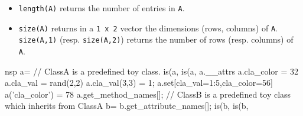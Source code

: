 \begin{itemize}
\item \verb+length(A)+ returns the number of entries in \verb+A+.
\item \verb+size(A)+ returns in a \verb+1 x 2+ vector the dimensions (rows, columns)
  of \verb+A+. \verb+size(A,1)+ (resp. \verb+size(A,2)+) returns the number of rows 
  (resp. columns) of \verb+A+.
\end{itemize}

\begin{examples}
  \begin{mintednsp}{nsp}
    a=%
    // ClassA is a predefined toy class.
    is(a,%
    is(a,%
    a.__attrs
    a.cla_color = 32 
    a.cla_val = rand(2,2)
    a.cla_val(3,3) = 1;
    a.set[cla_val=1:5,cla_color=56]
    a('cla_color') = 78 
    a.get_method_names[];
    // ClassB is a predefined toy class which inherits from ClassA
    b=%
    b.get_attribute_names[];
    is(b,%
    is(b,%
  \end{mintednsp}
\end{examples}

\begin{manseealso}

\end{manseealso}


